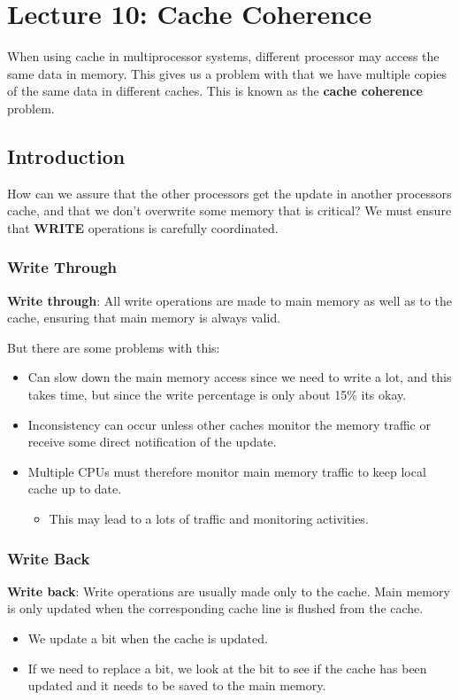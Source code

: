 \section{Lecture 10: Cache Coherence}
When using cache in multiprocessor systems, different processor may access the same data in memory. This gives us a problem with that we have multiple copies of the same data in different caches. This is known as the \textbf{cache coherence} problem.

\subsection{Introduction}
How can we assure that the other processors get the update in another processors cache, and that we don't overwrite some memory that is critical?
We must ensure that \textbf{WRITE} operations is carefully coordinated.
\subsubsection{Write Through}
\textbf{Write through}: All write operations are made to main memory as well as to the cache, ensuring that main memory is always valid.

But there are some problems with this:
\begin{itemize}
\item Can slow down the main memory access since we need to write a lot, and this takes time, but since the write percentage is only about 15\% its okay.
\item Inconsistency can occur unless other caches monitor the memory traffic or receive some direct notification of the update.
\item Multiple CPUs must therefore monitor main memory traffic to keep local cache up to date.
  \begin{itemize}
  \item This may lead to a lots of traffic and monitoring activities.
  \end{itemize}
\end{itemize}

\subsubsection{Write Back}
\textbf{Write back}: Write operations are usually made only to the cache. Main memory is only updated when the corresponding cache line is flushed from the cache.
\begin{itemize}
\item We update a bit when the cache is updated.
\item If we need to replace a bit, we look at the bit to see if the cache has been updated and it needs to be saved to the main memory.
\end{itemize}

